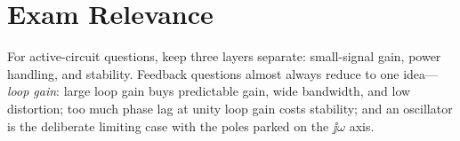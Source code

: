 \section{Exam Relevance}
\begin{exambox}
For active-circuit questions, keep three layers separate: small-signal gain,
power handling, and stability. Feedback questions almost always reduce to one
idea---\emph{loop gain}: large loop gain buys predictable gain, wide bandwidth,
and low distortion; too much phase lag at unity loop gain costs stability; and an
oscillator is the deliberate limiting case with the poles parked on the
\(\jj\omega\) axis.
\end{exambox}
